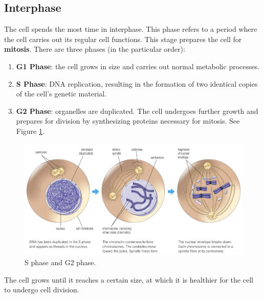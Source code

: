 \documentclass[12pt]{report}
\begin{document}
\subsection{Interphase}
\begin{definition}[Interphase]
    The cell spends the most time in interphase. This phase refers to a period where the cell carries out its regular cell functions. This stage prepares the cell for \textbf{mitosis}. There are three phases (in the particular order): 
    \begin{enumerate}
    \setlength\itemsep{0.5em}
        \item{ \textbf{G1 Phase}: the cell grows in size and carries out normal metabolic processes.}
        \item{ \textbf{S Phase}: DNA replication, resulting in the formation of two identical copies of the cell's genetic material.}
        \item{ \textbf{G2 Phase}: organelles are duplicated. The cell undergoes further growth and prepares for division by synthesizing proteins necessary for mitosis.}
        See Figure \ref{fig:interphase}.
    \end{enumerate}
\end{definition}

\begin{figure}[H]
    \centering
    \includegraphics[width=\textwidth]{../figures/interphase.png}
    \caption{S phase and G2 phase.}
    \label{fig:interphase}
\end{figure}

\begin{note}{ }
    The cell grows until it reaches a certain size, at which it is healthier for the cell to undergo cell division.
\end{note}
\end{document}
